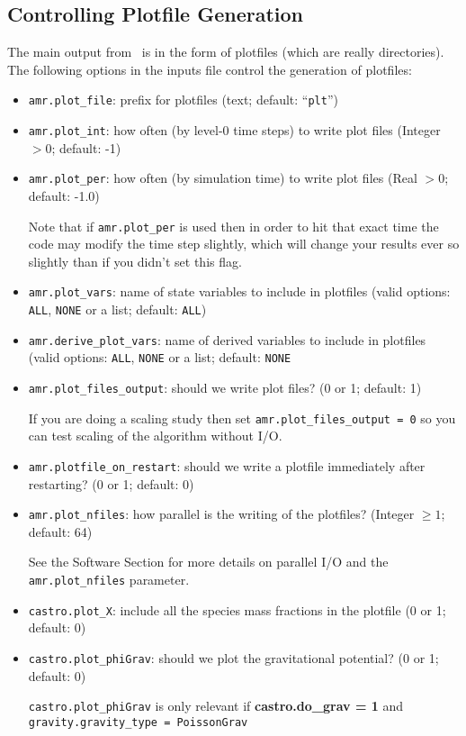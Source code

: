 \subsection{Controlling Plotfile Generation}
\label{sec:PlotFiles}
The main output from \castro\ is in the form of plotfiles (which are
really directories).  The following options in the inputs file control
the generation of plotfiles:
\begin{itemize}
\item {\tt amr.plot\_file}: prefix for plotfiles (text; default:
  ``{\tt plt}'')

\item {\tt amr.plot\_int}: how often (by level-0 time steps) to write
  plot files (Integer $> 0$; default: -1)

\item {\tt amr.plot\_per}: how often (by simulation time) to write
  plot files (Real $> 0$; default: -1.0)

Note that if {\tt amr.plot\_per} is used then in order to hit that
exact time the code may modify the time step slightly, which will
change your results ever so slightly than if you didn't set this flag.

\item {\tt amr.plot\_vars}: name of state variables to include in
  plotfiles (valid options: {\tt ALL}, {\tt NONE} or a list; default:
  {\tt ALL})

\item {\tt amr.derive\_plot\_vars}: name of derived variables to
  include in plotfiles (valid options: {\tt ALL}, {\tt NONE} or a
  list; default: {\tt NONE}

\item {\tt amr.plot\_files\_output}: should we write plot files? (0 or
  1; default: 1)

If you are doing a scaling study then set {\tt amr.plot\_files\_output
  = 0} so you can test scaling of the algorithm without I/O.

\item {\tt amr.plotfile\_on\_restart}: should we write a plotfile
  immediately after restarting?  (0 or 1; default: 0)
  
\item {\tt amr.plot\_nfiles}: how parallel is the writing of the
  plotfiles?  (Integer $\geq 1$; default: 64)

See the Software Section for more details on parallel I/O and the {\tt
  amr.plot\_nfiles} parameter.

\item {\tt castro.plot\_X}: include all the species mass fractions in
  the plotfile (0 or 1; default: 0)

\item {\tt castro.plot\_phiGrav}: should we plot the gravitational
  potential?  (0 or 1; default: 0)

  {\tt castro.plot\_phiGrav} is only relevant if {\bf castro.do\_grav
    = 1} and {\tt gravity.gravity\_type = PoissonGrav}

\end{itemize}

